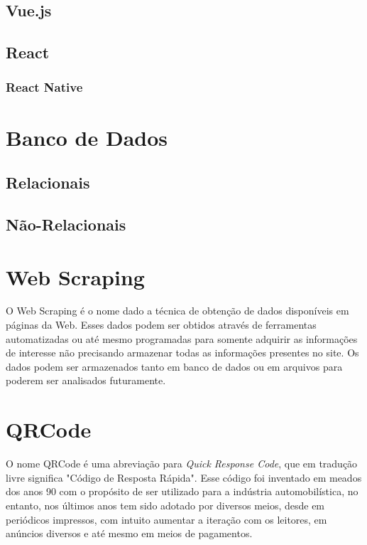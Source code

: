 \subsection{Vue.js}

\subsection{React}

\subsubsection{React Native} \label{React Native}
\fi

\section{Banco de Dados}

\subsection{Relacionais}

\subsection{Não-Relacionais}

\section{Web Scraping}

O Web Scraping é o nome dado a técnica de obtenção de dados disponíveis em páginas da Web. Esses dados podem ser obtidos através de ferramentas automatizadas ou até mesmo programadas para somente adquirir as informações de interesse não precisando armazenar todas as informações presentes no site.
Os dados podem ser armazenados tanto em banco de dados ou em arquivos para poderem ser analisados futuramente.


\section{QRCode}

O nome QRCode é uma abreviação para \textit{Quick Response Code}, que em tradução livre significa "Código de Resposta Rápida". Esse código foi inventado em meados dos anos 90 com o propósito de ser utilizado para a indústria automobilística, no entanto, nos últimos anos tem sido adotado por diversos meios, desde em periódicos impressos, com intuito aumentar a iteração com os leitores, em anúncios diversos e até mesmo em meios de pagamentos.

